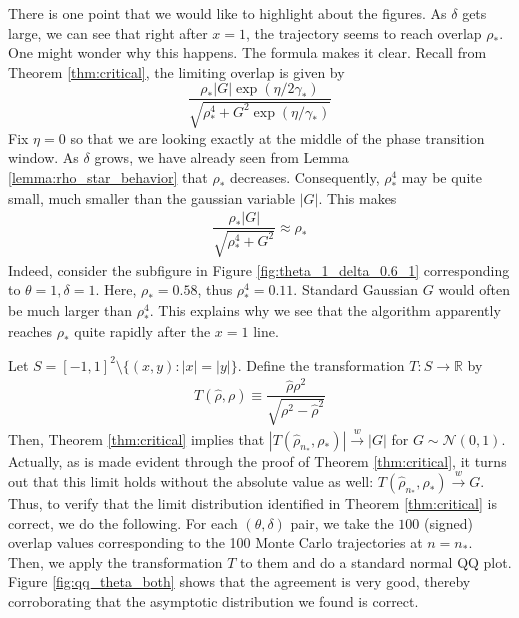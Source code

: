 \documentclass[12pt]{article}
\def\gN{{\mathcal{N}}}
\def\sR{{\mathbb{R}}}
\begin{document}
There is one point that we would like to highlight about the figures. As $\delta$ gets large, we can see that right after $x=1$, the trajectory seems to reach overlap $\rho_*$. One might wonder why this happens. The formula makes it clear. Recall from Theorem \ref{thm:critical}, the limiting overlap is given by $$\dfrac{\rho_*|G|\exp(\eta/2\gamma_*)}{\sqrt{\rho_*^4 + G^2\exp(\eta/\gamma_*)}}$$
Fix $\eta=0$ so that we are looking exactly at the middle of the phase transition window. As $\delta$ grows, we have already seen from Lemma \ref{lemma:rho_star_behavior} that $\rho_*$ decreases. Consequently, $\rho_*^4$ may be quite small, much smaller than the gaussian variable $|G|$. This makes
\begin{align*}
    \dfrac{\rho_*|G|}{\sqrt{\rho_*^4 + G^2}}\approx \rho_*
\end{align*}Indeed, consider the subfigure in Figure \ref{fig:theta_1_delta_0.6_1} corresponding to $\theta=1,\delta=1$. Here, $\rho_*=0.58$, thus $\rho_*^4=0.11$. Standard Gaussian $G$ would often be much larger than $\rho_*^4$. This explains why we see that the algorithm apparently reaches $\rho_*$ quite rapidly after the $x=1$ line.

\medskip

Let $S=[-1,1]^2\setminus \{(x,y):|x|=|y|\}$. Define the transformation $T:S\to \sR$ by 
\begin{align*}
    T(\hat\rho,\rho)\equiv \dfrac{\hat\rho\rho^2}{\sqrt{\rho^2-\hat\rho^2}}
\end{align*}Then, 
Theorem \ref{thm:critical} implies that $|T(\hat\rho_{n_*},\rho_*)|\stackrel{w}{\to}|G|$
for $G\sim\gN(0,1)$. Actually, as is made evident through the proof of Theorem \ref{thm:critical}, it turns out that this limit holds without the absolute value as well: $T(\hat\rho_{n_*},\rho_*)\stackrel{w}{\to}G$. Thus, to verify that the limit distribution identified in Theorem \ref{thm:critical} is correct, we do the following. For each $(\theta,\delta)$ pair, we take the $100$ (signed) overlap values corresponding to the 100 Monte Carlo trajectories at $n=n_*$. Then, we apply the transformation $T$ to them and do a standard normal QQ plot. Figure \ref{fig:qq_theta_both} shows that the agreement is very good, thereby corroborating that the asymptotic distribution we found is correct.
\end{document}
